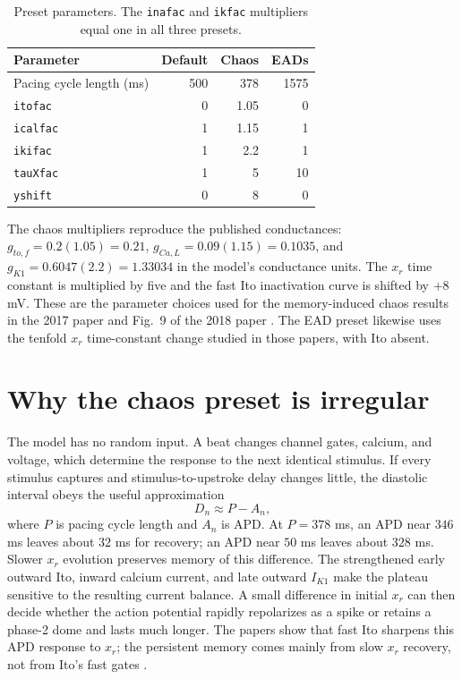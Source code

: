 \documentclass[11pt]{article}
\begin{document}
\begin{table}[H]
\centering
\caption{Preset parameters. The \texttt{inafac} and \texttt{ikfac} multipliers equal one in all three presets.}
\begin{tabular}{lrrr}
\toprule
Parameter & Default & Chaos & EADs \\
\midrule
Pacing cycle length (ms) & 500 & 378 & 1575 \\
\texttt{itofac} & 0 & 1.05 & 0 \\
\texttt{icalfac} & 1 & 1.15 & 1 \\
\texttt{ikifac} & 1 & 2.2 & 1 \\
\texttt{tauXfac} & 1 & 5 & 10 \\
\texttt{yshift} & 0 & 8 & 0 \\
\bottomrule
\end{tabular}
\end{table}

The chaos multipliers reproduce the published conductances: $g_{to,f}=0.2(1.05)=0.21$, $g_{Ca,L}=0.09(1.15)=0.1035$, and $g_{K1}=0.6047(2.2)=1.33034$ in the model's conductance units. The $x_r$ time constant is multiplied by five and the fast Ito inactivation curve is shifted by $+8$ mV. These are the parameter choices used for the memory-induced chaos results in the 2017 paper and Fig.~9 of the 2018 paper \cite{landaw2017,landaw2018}. The EAD preset likewise uses the tenfold $x_r$ time-constant change studied in those papers, with Ito absent.

\section{Why the chaos preset is irregular}

The model has no random input. A beat changes channel gates, calcium, and voltage, which determine the response to the next identical stimulus. If every stimulus captures and stimulus-to-upstroke delay changes little, the diastolic interval obeys the useful approximation
\begin{equation}
 D_n\approx P-A_n,
\end{equation}
where $P$ is pacing cycle length and $A_n$ is APD. At $P=378$ ms, an APD near $346$ ms leaves about $32$ ms for recovery; an APD near $50$ ms leaves about $328$ ms. Slower $x_r$ evolution preserves memory of this difference. The strengthened early outward Ito, inward calcium current, and late outward $I_{K1}$ make the plateau sensitive to the resulting current balance. A small difference in initial $x_r$ can then decide whether the action potential rapidly repolarizes as a spike or retains a phase-2 dome and lasts much longer. The papers show that fast Ito sharpens this APD response to $x_r$; the persistent memory comes mainly from slow $x_r$ recovery, not from Ito's fast gates \cite{landaw2017,landaw2018}.
\end{document}
